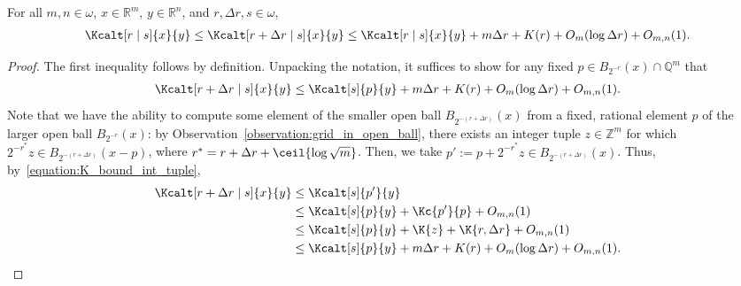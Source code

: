 \begin{lemma}
    \label{minmax_linear_sensitivity_in_r}
    For all $m, n \in \omega$, $x \in \mathbb{R}^m$, $y \in \mathbb{R}^n$, and $r, \Delta r, s \in \omega$,
    \begin{align*}
        \Kcalt[r \mid s]{x}{y} \leq \Kcalt[r + \Delta r \mid s]{x}{y} \leq \Kcalt[r \mid s]{x}{y} + m \Delta r + K(r) + O_{m}(\log \Delta r) + O_{m, n}(1).
    \end{align*}
\end{lemma}
\begin{proof}
    The first inequality follows by definition. Unpacking the notation, it suffices to show for any fixed $p \in B_{2^{-r}}(x) \cap \mathbb{Q}^m$ that 
    \begin{align*}
        \Kcalt[r + \Delta r \mid s]{x}{y} \leq \Kcalt[s]{p}{y} + m \Delta r + K(r) + O_{m}(\log \Delta r) + O_{m, n}(1).
    \end{align*}
    Note that we have the ability to compute some element of the smaller open ball $B_{2^{-(r + \Delta r)}}(x)$ from a fixed, rational element $p$ of the larger open ball $B_{2^{-r}}(x)$: by Observation~\ref{observation:grid_in_open_ball}, there exists an integer tuple $z \in \mathbb{Z}^m$ for which $2^{-r^*}z \in B_{2^{-(r + \Delta r)}}(x - p)$, where $r^* = r + \Delta r + \ceil{\log \sqrt{m}}$. Then, we take $p' := p + 2^{-r^*} z \in B_{2^{-(r + \Delta r)}}(x)$. Thus, by~\eqref{equation:K_bound_int_tuple},
    \begin{align*}
        \Kcalt[r + \Delta r \mid s]{x}{y} &\leq  \Kcalt[s]{p'}{y}\\
        &\leq \Kcalt[s]{p}{y} + \Kc{p'}{p} + O_{m, n}(1) \\
        &\leq \Kcalt[s]{p}{y} + \K{z} + \K{r, \Delta r} + O_{m, n}(1)\\
        &\leq \Kcalt[s]{p}{y} + m \Delta r + K(r) + O_{m}(\log \Delta r) + O_{m, n}(1).
    \end{align*}
\end{proof}


